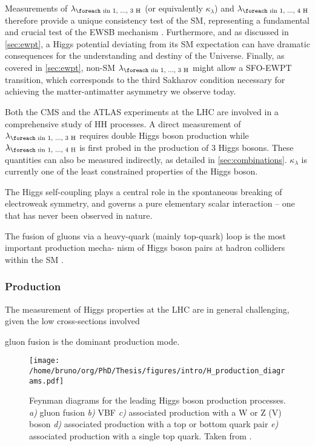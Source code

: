 \documentclass[11pt]{article}
\newcommand{\repeatn}[2]{\foreach \i in {1, ..., #1} {#2}}
\newcommand{\lh}[1]{\lambda_{\text{\repeatn{#1}{H}}}}
\newcommand{\kl}{\kappa_{\lambda}}
\begin{document}
Measurements of \(\lh{3}\) (or equivalently \(\kl\)) and \(\lh{4}\) therefore provide a unique consistency test of the \ac{SM}, representing a fundamental and crucial test of the \ac{EWSB} mechanism \cite{deFlorian:2227475}.
Furthermore, and as discussed in \cref{sec:ewpt}, a Higgs potential deviating from its SM expectation can have dramatic consequences for the understanding and destiny of the Universe.
Finally, as covered in \cref{sec:ewpt}, non-SM \(\lh{3}\) might allow a \ac{SFO-EWPT} transition, which corresponds to the third Sakharov condition necessary for achieving the matter-antimatter asymmetry we observe today.

Both the \ac{CMS} and the \ac{ATLAS} experiments at the \ac{LHC} are involved in a comprehensive study of HH processes.
A direct measurement of \(\lh{3}\) requires double Higgs boson production while \(\lh{4}\) is first probed in the production of 3 Higgs bosons.
These quantities can also be measured indirectly, as detailed in \cref{sec:combinations}.
\(\kl\) is currently one of the least constrained properties of the Higgs boson.


The Higgs self-coupling plays a central role in the spontaneous breaking of electroweak symmetry, and governs a pure elementary scalar interaction – one that has never been observed in nature.

The fusion of gluons via a heavy-quark (mainly top-quark) loop is the most important production mecha-
nism of Higgs boson pairs at hadron colliders within the SM \cite{hllhc_physics}.

\subsubsection{Production}
\label{sec:org772317e}
\label{sec:production}

The measurement of Higgs properties at the LHC are in general challenging, given the low cross-sections involved

gluon fusion is the dominant production mode.

\begin{figure}[htbp]
\centering
\texttt{[image: /home/bruno/org/PhD/Thesis/figures/intro/H\_production\_diagrams.pdf]}
\caption{\label{fig:H_production_diagrams}Feynman diagrams for the leading Higgs boson production processes. \emph{a)} gluon fusion \emph{b)} \ac{VBF} \emph{c)} associated production with a W or Z (V) boson \emph{d)} associated production with a top or bottom quark pair \emph{e)} associated production with a single top quark. Taken from \cite{higgs_10_years}.}
\end{figure}
\end{document}
